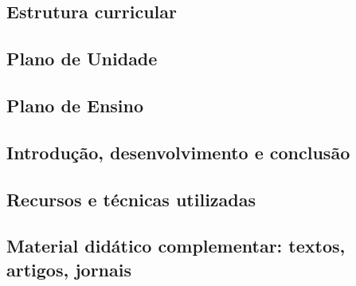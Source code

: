 \hspace{1.5cm}
\subsection{Estrutura curricular}

\subsection{Plano de Unidade}

\subsection{Plano de Ensino}

\subsection{Introdução, desenvolvimento e conclusão}

\subsection{Recursos e técnicas utilizadas}

\subsection{Material didático complementar: textos, artigos, jornais}

